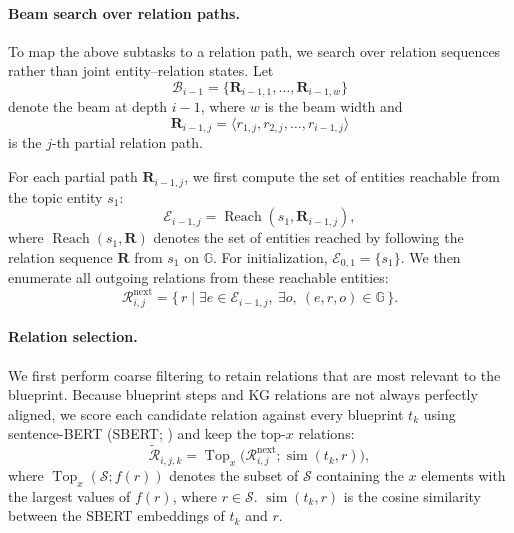 \documentclass[11pt]{article}
\begin{document}
\paragraph{Beam search over relation paths.}
To map the above subtasks to a relation path, we search over relation sequences rather than joint entity--relation states. Let
\begin{equation}
\mathcal{B}_{i-1}=\{\mathbf{R}_{i-1,1},\ldots,\mathbf{R}_{i-1,w}\}
\end{equation}
denote the beam at depth $i-1$, where $w$ is the beam width and
\begin{equation}
\mathbf{R}_{i-1,j}=\langle r_{1,j},r_{2,j},\ldots,r_{i-1,j}\rangle
\end{equation}
is the $j$-th partial relation path.

For each partial path $\mathbf{R}_{i-1,j}$, we first compute the set of entities reachable from the topic entity $s_1$:
\begin{equation}
\mathcal{E}_{i-1,j}=\operatorname{Reach}(s_1,\mathbf{R}_{i-1,j}),
\label{eq:reachable_entities}
\end{equation}
where $\operatorname{Reach}(s_1,\mathbf{R})$ denotes the set of entities reached by following the relation sequence $\mathbf{R}$ from $s_1$ on $\mathbb{G}$. For initialization, $\mathcal{E}_{0,1}=\{s_1\}$. We then enumerate all outgoing relations from these reachable entities:
\begin{equation}
\mathcal{R}^{\mathrm{next}}_{i,j}
=
\{\,r \mid \exists e\in \mathcal{E}_{i-1,j},\ \exists o,\ (e,r,o)\in\mathbb{G}\,\}.
\label{eq:next_relations}
\end{equation}

\paragraph{Relation selection.}
We first perform coarse filtering to retain relations that are most relevant to the blueprint. Because blueprint steps and KG relations are not always perfectly aligned, we score each candidate relation against every blueprint $t_k$ using sentence-BERT (SBERT; \citealp{reimers-gurevych-2019-sentence}) and keep the top-$x$ relations:
\begin{equation}
\widetilde{\mathcal{R}}_{i,j,k}
=
\operatorname{Top}_x
\bigl(
\mathcal{R}^{\mathrm{next}}_{i,j};
\operatorname{sim}(t_k,r)
\bigr),
\label{eq:relation_filter}
\end{equation}
where $\operatorname{Top}_x(\mathcal{S}; f(r))$ denotes the subset of $\mathcal{S}$ containing the $x$ elements with the largest values of $f(r)$, where $r \in \mathcal{S}$. $\operatorname{sim}(t_k,r)$ is the cosine similarity between the SBERT embeddings of $t_k$ and $r$.
\end{document}
